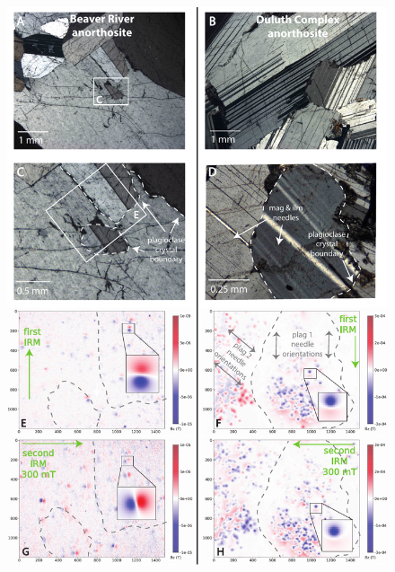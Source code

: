 \documentclass[9pt,twocolumn,twoside,lineno]{pnas-new}
\begin{document}
\begin{figure}
\centering
\noindent\includegraphics[width=12.4 cm]{Petro_QDM_full.pdf}

\end{figure}
\end{document}
